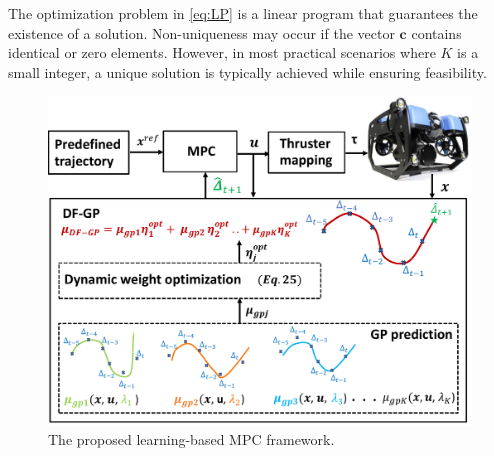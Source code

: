 

\begin{remark}
The optimization problem in \eqref{eq:LP} is a linear program that guarantees the existence of a solution. Non-uniqueness may occur if the vector $\mathbf{c}$ contains identical or zero elements. However, in most practical scenarios where $K$ is a small integer, a unique solution is typically achieved while ensuring feasibility.
\end{remark}









\begin{figure}[t]
	\centering	\includegraphics[width=1.0\linewidth]{figures/Introduction/new_abstract.pdf}
	\caption{ The proposed learning-based \ac{MPC} framework. }

 
	\label{fig:abstract}
\end{figure}


